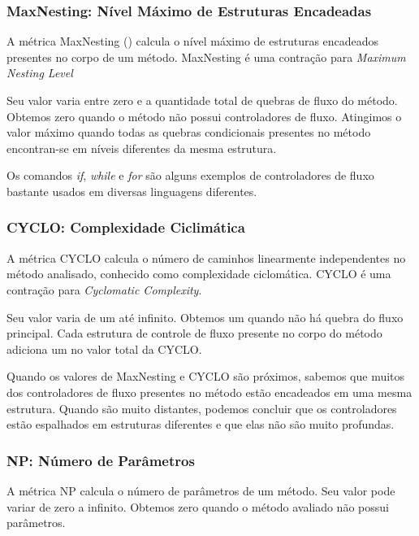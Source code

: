 \subsubsection{MaxNesting: Nível Máximo de Estruturas Encadeadas}
                         
	A métrica MaxNesting (\citep{Lanza06}) calcula o nível máximo de estruturas encadeados presentes no corpo de um método. MaxNesting é uma contração para \textit{Maximum Nesting Level}
	
	Seu valor varia entre zero e a quantidade total de quebras de fluxo do método. Obtemos zero quando o método não possui controladores de fluxo. Atingimos o valor máximo quando todas as quebras condicionais presentes no método encontran-se em níveis diferentes da mesma estrutura.
	
	Os comandos \textit{if}, \textit{while} e \textit{for} são alguns exemplos de controladores de fluxo bastante usados em diversas linguagens diferentes.                
	
                                                             

\subsubsection{CYCLO: Complexidade Ciclimática}

	A métrica CYCLO \citep{McCabe76} calcula o número de caminhos linearmente independentes no método analisado, conhecido como complexidade ciclomática. CYCLO é uma contração para \textit{Cyclomatic Complexity}.
	
	Seu valor varia de um até infinito. Obtemos um quando não há quebra do fluxo principal. Cada estrutura de controle de fluxo presente no corpo do método adiciona um no valor total da CYCLO.
	                          
	Quando os valores de MaxNesting e CYCLO são próximos, sabemos que muitos dos controladores de fluxo presentes no método estão encadeados em uma mesma estrutura. Quando são muito distantes, podemos concluir que os controladores estão espalhados em estruturas diferentes e que elas não são muito profundas.



\subsubsection{NP: Número de Parâmetros}

	A métrica NP calcula o número de parâmetros de um método. Seu valor pode variar de zero a infinito. Obtemos zero quando o método avaliado não possui parâmetros.

